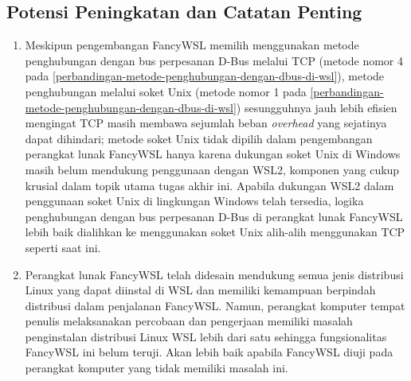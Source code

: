 \subsection{Potensi Peningkatan dan Catatan Penting}

\begin{enumerate}
    \item Meskipun pengembangan FancyWSL memilih menggunakan metode penghubungan dengan bus perpesanan D-Bus melalui TCP (metode nomor 4 pada \autoref{perbandingan-metode-penghubungan-dengan-dbus-di-wsl}), metode penghubungan melalui soket Unix (metode nomor 1 pada \autoref{perbandingan-metode-penghubungan-dengan-dbus-di-wsl}) sesungguhnya jauh lebih efisien mengingat TCP masih membawa sejumlah beban \textit{overhead} yang sejatinya dapat dihindari; metode soket Unix tidak dipilih dalam pengembangan perangkat lunak FancyWSL hanya karena dukungan soket Unix di Windows masih belum mendukung penggunaan dengan WSL2, komponen yang cukup krusial dalam topik utama tugas akhir ini. Apabila dukungan WSL2 dalam penggunaan soket Unix di lingkungan Windows telah tersedia, logika penghubungan dengan bus perpesanan D-Bus di perangkat lunak FancyWSL lebih baik dialihkan ke menggunakan soket Unix alih-alih menggunakan TCP seperti saat ini.

    \item Perangkat lunak FancyWSL telah didesain mendukung semua jenis distribusi Linux yang dapat diinstal di WSL dan memiliki kemampuan berpindah distribusi dalam penjalanan FancyWSL. Namun, perangkat komputer tempat penulis melaksanakan percobaan dan pengerjaan memiliki masalah penginstalan distribusi Linux WSL lebih dari satu sehingga fungsionalitas FancyWSL ini belum teruji. Akan lebih baik apabila FancyWSL diuji pada perangkat komputer yang tidak memiliki masalah ini.
\end{enumerate}


